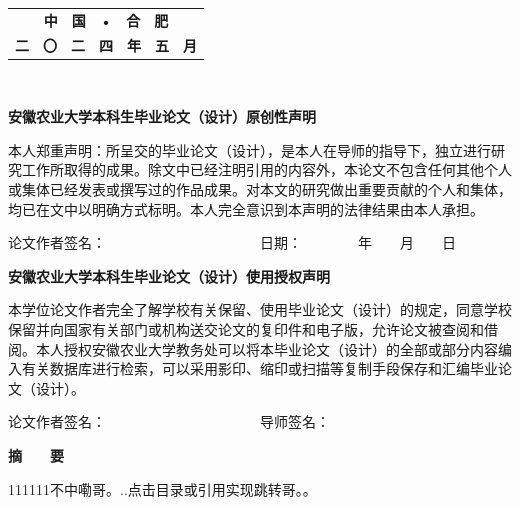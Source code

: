 \documentclass[UTF8,a4paper,12pt]{ctexart}
\begin{document}
	\vspace{4cm} 
	\begin{table}[!h]
		\renewcommand\arraystretch{2}
		\setlength\tabcolsep{16pt}
		\centering
		\begin{tabular}{c}
			\textbf{\fontsize{16pt}{\baselineskip}\heiti 中　国　•　合　肥 }\\
			\textbf{\fontsize{16pt}{\baselineskip}\heiti 二　〇　二　四　年　五　月} \\
		\end{tabular}
	\end{table}
	\thispagestyle{empty}
	\newpage　
	\vspace{1cm} \par \textbf{\fontsize{18pt}{\baselineskip}\heiti 安徽农业大学本科生毕业论文（设计）原创性声明}
	\vspace{1cm} \par 本人郑重声明：所呈交的毕业论文（设计），是本人在导师的指导下，独立进行研究工作所取得的成果。除文中已经注明引用的内容外，本论文不包含任何其他个人或集体已经发表或撰写过的作品成果。对本文的研究做出重要贡献的个人和集体，均已在文中以明确方式标明。本人完全意识到本声明的法律结果由本人承担。
	\vspace{1cm} \par 论文作者签名：　　　　　　　　　　　日期：　　　　年　　月　　日
	\vspace{6cm} \par \textbf{\fontsize{18pt}{\baselineskip}\heiti  安徽农业大学本科生毕业论文（设计）使用授权声明}
	\vspace{1cm} \par 本学位论文作者完全了解学校有关保留、使用毕业论文（设计）的规定，同意学校保留并向国家有关部门或机构送交论文的复印件和电子版，允许论文被查阅和借阅。本人授权安徽农业大学教务处可以将本毕业论文（设计）的全部或部分内容编入有关数据库进行检索，可以采用影印、缩印或扫描等复制手段保存和汇编毕业论文（设计）。
	\vspace{1cm} \par 论文作者签名：　　　　　　　　　　　导师签名：
	\thispagestyle{empty}
	
	\newpage
	
	\begin{spacing}{1.4}
	\tableofcontents
	
	\end{spacing}
	\thispagestyle{fancy}
	\fancyfoot{}
	\newpage
	\fancyfoot[C]{\thepage} 
	 
	\centerline{\textbf{\fontsize{16pt}{\baselineskip}\heiti 摘　　要}}
	\vspace{0.4cm}
	111111不中嘞哥。..点击目录或引用实现跳转哥。。
\end{document}
